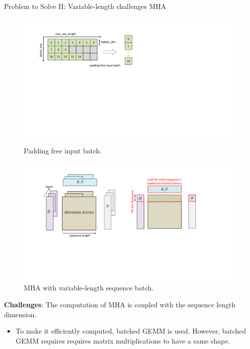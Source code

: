 \begin{frame}{Problem to Solve II: Variable-length challenges MHA}
        \begin{figure}[ht]
            \begin{minipage}[b]{0.5\linewidth}
                \centering
                \includegraphics[width=\textwidth]{./images/bytetransformer-padding-free-input-batch.pdf}
                \footnotesize{\caption{Padding free input batch.}}
            \end{minipage}
            \hspace{0.5cm}
            \begin{minipage}[b]{0.3\linewidth}
                \centering
                \includegraphics[width=\textwidth]{images/MHA-variable-seq-length.pdf}
                \footnotesize{\caption{MHA with variable-length sequence batch.}}
            \end{minipage}
        \end{figure}
    \footnotesize{
        \textbf{Challenges}: The computation of MHA is coupled with the sequence length dimension.
        \begin{itemize}
            \item To make it efficiently computed, batched GEMM is used. However, batched GEMM requires requires matrix multiplications to have a same shape.
        \end{itemize}
    }
\end{frame}

